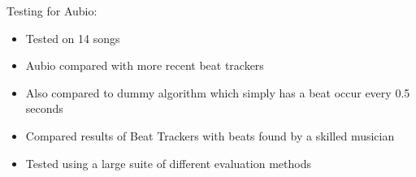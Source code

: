 \documentclass{beamer}
\begin{document}
	\begin{frame}
		Testing for Aubio:
		\begin{itemize}
			\item Tested on 14 songs
			\item Aubio compared with more recent beat trackers
			\item Also compared to dummy algorithm which simply has a beat occur every 0.5 seconds
			\item Compared results of Beat Trackers with beats found by a skilled musician
			\item Tested using a large suite of different evaluation methods

		\end{itemize}
	\end{frame}
\end{document}
